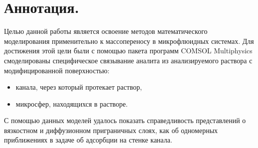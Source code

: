 \documentclass[oneside,final,12pt]{extreport}
\begin{document}


\setcounter{page}{2}

\section*{Аннотация.}
Целью данной работы является освоение методов математического моделирования
применительно к массопереносу в микрофлюидных системах.
Для достижения этой цели были с помощью пакета программ COMSOL Multiphysics\texttrademark{}
смоделированы специфическое связывание аналита из анализируемого раствора
с модифицированной поверхностью:
\begin{itemize}
  \item канала, через который протекает раствор,
  \item микросфер, находящихся в растворе.

\end{itemize}


С помощью данных моделей удалось показать справедливость
представлений о вязкостном и диффузионном приграничных слоях,
как об одномерных приближениях в задаче
об адсорбции на стенке канала.


\tableofcontents

\clearpage
\end{document}
